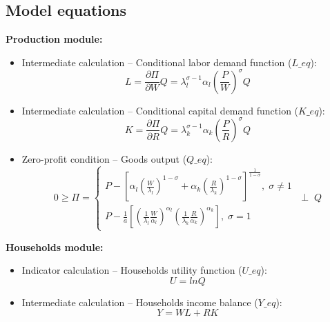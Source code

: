 \documentclass[12pt, a4paper]{article}
\numberwithin{equation}{section}
\numberwithin{figure}{section}
\numberwithin{table}{section}
\begin{document}
\subsection{Model equations}\label{v1.0-equations}
\textbf{Production module:}
\begin{itemize}
	\item Intermediate calculation -- Conditional labor demand function (\(L\_eq\)): 
	\begin{equation}
		L = \frac{\partial\Pi}{\partial W}Q = \lambda_{l}^{\sigma-1}\alpha_{l}\left(\frac{P}{W}\right)^\sigma Q
	\end{equation}
	\item Intermediate calculation -- Conditional capital demand function (\(K\_eq\)): 
	\begin{equation}
		K = \frac{\partial\Pi}{\partial R}Q = \lambda_{k}^{\sigma-1}\alpha_{k}\left(\frac{P}{R}\right)^\sigma Q
	\end{equation}
	\item Zero-profit condition -- Goods output (\(Q\_eq\)): 
	\begin{equation}
		0\geq\Pi = 
		\begin{cases}
		 P-\left[\alpha_{l}\left(\frac{W}{\lambda_{l}}\right)^{1-\sigma}+\alpha_{k}\left(\frac{R}{\lambda_{k}}\right)^{1-\sigma}\right]^{\frac{1}{1-\sigma}},\; \sigma\ne1\\
		 P-\frac{1}{a}\left[\left(\frac{1}{\lambda_{l}}\frac{W}{\alpha_l}\right)^{\alpha_{l}}\left(\frac{1}{\lambda_{k}}\frac{R}{\alpha_k}\right)^{\alpha_{k}}\right],\; \sigma=1
		\end{cases}
		\;\perp\; Q
	\end{equation}
\end{itemize}

\textbf{Households module:} 
\begin{itemize}
	\item Indicator calculation -- Households utility function (\(U\_eq\)): 
	\begin{equation}
		U = lnQ
	\end{equation}
	\item Intermediate calculation -- Households income balance (\(Y\_eq\)): 
	 \begin{equation}
		Y = WL+RK
	\end{equation}
\end{itemize}
\end{document}
